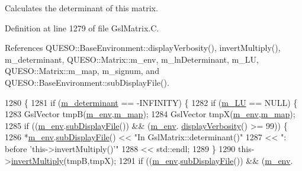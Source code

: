 Calculates the determinant of {\ttfamily this} matrix. 



Definition at line 1279 of file Gsl\-Matrix.\-C.



References Q\-U\-E\-S\-O\-::\-Base\-Environment\-::display\-Verbosity(), invert\-Multiply(), m\-\_\-determinant, Q\-U\-E\-S\-O\-::\-Matrix\-::m\-\_\-env, m\-\_\-ln\-Determinant, m\-\_\-\-L\-U, Q\-U\-E\-S\-O\-::\-Matrix\-::m\-\_\-map, m\-\_\-signum, and Q\-U\-E\-S\-O\-::\-Base\-Environment\-::sub\-Display\-File().


\begin{DoxyCode}
1280 \{
1281   \textcolor{keywordflow}{if} (\hyperlink{class_q_u_e_s_o_1_1_gsl_matrix_a8be32859eb361fe9865d6df3a31aa579}{m\_determinant} == -INFINITY) \{
1282     \textcolor{keywordflow}{if} (\hyperlink{class_q_u_e_s_o_1_1_gsl_matrix_ada9c659bda4c71273af34e79eba4ec81}{m\_LU} == NULL) \{
1283       GslVector tmpB(\hyperlink{class_q_u_e_s_o_1_1_matrix_a247fb0fc0b87fecdee054bb4660b68e8}{m\_env},\hyperlink{class_q_u_e_s_o_1_1_matrix_adb42d344c0b2859c3b4a4f5a3dd7875f}{m\_map});
1284       GslVector tmpX(\hyperlink{class_q_u_e_s_o_1_1_matrix_a247fb0fc0b87fecdee054bb4660b68e8}{m\_env},\hyperlink{class_q_u_e_s_o_1_1_matrix_adb42d344c0b2859c3b4a4f5a3dd7875f}{m\_map});
1285       \textcolor{keywordflow}{if} ((\hyperlink{class_q_u_e_s_o_1_1_matrix_a247fb0fc0b87fecdee054bb4660b68e8}{m\_env}.\hyperlink{class_q_u_e_s_o_1_1_base_environment_a8a0064746ae8dddfece4229b9ad374d6}{subDisplayFile}()) && (\hyperlink{class_q_u_e_s_o_1_1_matrix_a247fb0fc0b87fecdee054bb4660b68e8}{m\_env}.
      \hyperlink{class_q_u_e_s_o_1_1_base_environment_a1fe5f244fc0316a0ab3e37463f108b96}{displayVerbosity}() >= 99)) \{
1286         *\hyperlink{class_q_u_e_s_o_1_1_matrix_a247fb0fc0b87fecdee054bb4660b68e8}{m\_env}.\hyperlink{class_q_u_e_s_o_1_1_base_environment_a8a0064746ae8dddfece4229b9ad374d6}{subDisplayFile}() << \textcolor{stringliteral}{"In GslMatrix::determinant()"}
1287                                 << \textcolor{stringliteral}{": before 'this->invertMultiply()'"}
1288                                 << std::endl;
1289       \}
1290       this->\hyperlink{class_q_u_e_s_o_1_1_gsl_matrix_a2eea3056f561ffeaee754b71cfcfa27e}{invertMultiply}(tmpB,tmpX);
1291       \textcolor{keywordflow}{if} ((\hyperlink{class_q_u_e_s_o_1_1_matrix_a247fb0fc0b87fecdee054bb4660b68e8}{m\_env}.\hyperlink{class_q_u_e_s_o_1_1_base_environment_a8a0064746ae8dddfece4229b9ad374d6}{subDisplayFile}()) && (\hyperlink{class_q_u_e_s_o_1_1_matrix_a247fb0fc0b87fecdee054bb4660b68e8}{m\_env}.

\end{DoxyCode}
